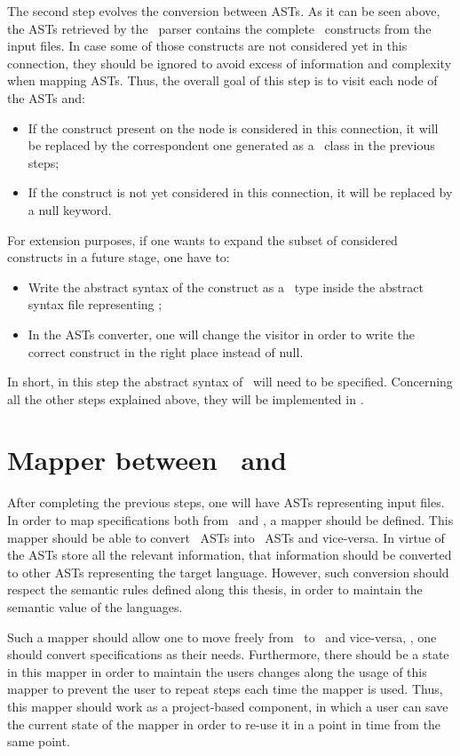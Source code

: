 The second step evolves the conversion between ASTs. As it can be seen above, the ASTs retrieved by the \jml\ parser contains the complete \jml\ constructs from the input files. In case some of those constructs are not considered yet in this connection, they should be ignored to avoid excess of information and complexity when mapping ASTs. Thus, the overall goal of this step is to visit each node of the ASTs and:
\begin{itemize}
\item If the construct present on the node is considered in this connection, it will be replaced by the correspondent one generated as a \java\ class in the previous steps;
\item If the construct is not yet considered in this connection, it will be replaced by a null keyword.
\end{itemize} 
For extension purposes, if one wants to expand the subset of considered constructs in a future stage, one have to:
\begin{itemize}
\item Write the abstract syntax of the construct as a \vdm\ type inside the abstract syntax file representing \jml ;
\item In the ASTs converter, one will change the visitor in order to write the correct construct in the right place instead of null.
\end{itemize}
In short, in this step the abstract syntax of \jml\ will need to be specified. Concerning all the other steps explained above, they will be implemented in \java.

\section{Mapper between \vpp\ and \jml}
\label{chapter5:sec:mapper}

After completing the previous steps, one will have ASTs representing input files. In order to map specifications both from \vpp\ and \jml, a mapper should be defined. This mapper should be able to convert \vpp\ ASTs into \jml\ ASTs and vice-versa. In virtue of the ASTs store all the relevant information, that information should be converted to other ASTs representing the target language. However, such conversion should respect the semantic rules defined along this thesis, in order to maintain the semantic value of the languages.

Such a mapper should allow one to move freely from \vpp\ to \jml\ and vice-versa, \ie, one should convert specifications as their needs. Furthermore, there should be a state in this mapper in order to maintain the users changes along the usage of this mapper to prevent the user to repeat steps each time the mapper is used. Thus, this mapper should work as a project-based component, in which a user can save the current state of the mapper in order to re-use it in a point in time from the same point. 

